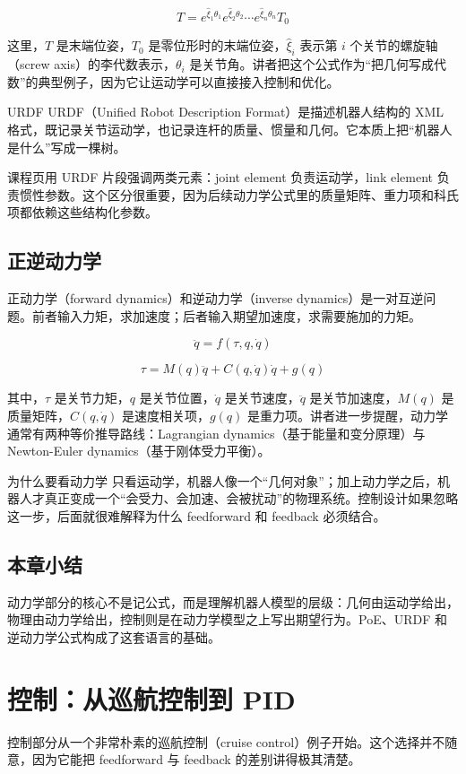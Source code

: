\documentclass[a4paper]{article}
\begin{document}
\[
T = e^{\hat{\xi}_1 \theta_1} e^{\hat{\xi}_2 \theta_2} \cdots e^{\hat{\xi}_n \theta_n} T_0
\]

这里，\(T\) 是末端位姿，\(T_0\) 是零位形时的末端位姿，\(\hat{\xi}_i\) 表示第 \(i\) 个关节的螺旋轴（screw axis）的李代数表示，\(\theta_i\) 是关节角。讲者把这个公式作为“把几何写成代数”的典型例子，因为它让运动学可以直接接入控制和优化。

\begin{knowledgebox}{URDF}
URDF（Unified Robot Description Format）是描述机器人结构的 XML 格式，既记录关节运动学，也记录连杆的质量、惯量和几何。它本质上把“机器人是什么”写成一棵树。
\end{knowledgebox}

课程页用 URDF 片段强调两类元素：joint element 负责运动学，link element 负责惯性参数。这个区分很重要，因为后续动力学公式里的质量矩阵、重力项和科氏项都依赖这些结构化参数。

\subsection{正逆动力学}
正动力学（forward dynamics）和逆动力学（inverse dynamics）是一对互逆问题。前者输入力矩，求加速度；后者输入期望加速度，求需要施加的力矩。

\[
\ddot q = f(\tau, q, \dot q)
\]

\[
\tau = M(q)\ddot q + C(q,\dot q)\dot q + g(q)
\]

其中，\(\tau\) 是关节力矩，\(q\) 是关节位置，\(\dot q\) 是关节速度，\(\ddot q\) 是关节加速度，\(M(q)\) 是质量矩阵，\(C(q,\dot q)\) 是速度相关项，\(g(q)\) 是重力项。讲者进一步提醒，动力学通常有两种等价推导路线：Lagrangian dynamics（基于能量和变分原理）与 Newton-Euler dynamics（基于刚体受力平衡）。

\begin{importantbox}{为什么要看动力学}
只看运动学，机器人像一个“几何对象”；加上动力学之后，机器人才真正变成一个“会受力、会加速、会被扰动”的物理系统。控制设计如果忽略这一步，后面就很难解释为什么 feedforward 和 feedback 必须结合。
\end{importantbox}

\subsection{本章小结}
动力学部分的核心不是记公式，而是理解机器人模型的层级：几何由运动学给出，物理由动力学给出，控制则是在动力学模型之上写出期望行为。PoE、URDF 和逆动力学公式构成了这套语言的基础。

\section{控制：从巡航控制到 PID}
控制部分从一个非常朴素的巡航控制（cruise control）例子开始。这个选择并不随意，因为它能把 feedforward 与 feedback 的差别讲得极其清楚。
\end{document}
